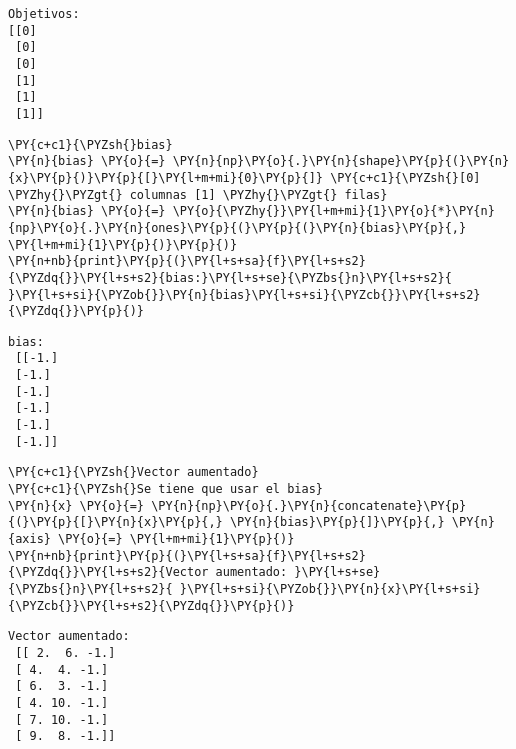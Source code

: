     \begin{Verbatim}[commandchars=\\\{\}]
Objetivos:
[[0]
 [0]
 [0]
 [1]
 [1]
 [1]]
    \end{Verbatim}

    \begin{tcolorbox}[breakable, size=fbox, boxrule=1pt, pad at break*=1mm,colback=cellbackground, colframe=cellborder]
\begin{Verbatim}[commandchars=\\\{\}]
\PY{c+c1}{\PYZsh{}bias}
\PY{n}{bias} \PY{o}{=} \PY{n}{np}\PY{o}{.}\PY{n}{shape}\PY{p}{(}\PY{n}{x}\PY{p}{)}\PY{p}{[}\PY{l+m+mi}{0}\PY{p}{]} \PY{c+c1}{\PYZsh{}[0] \PYZhy{}\PYZgt{} columnas [1] \PYZhy{}\PYZgt{} filas}
\PY{n}{bias} \PY{o}{=} \PY{o}{\PYZhy{}}\PY{l+m+mi}{1}\PY{o}{*}\PY{n}{np}\PY{o}{.}\PY{n}{ones}\PY{p}{(}\PY{p}{(}\PY{n}{bias}\PY{p}{,} \PY{l+m+mi}{1}\PY{p}{)}\PY{p}{)}
\PY{n+nb}{print}\PY{p}{(}\PY{l+s+sa}{f}\PY{l+s+s2}{\PYZdq{}}\PY{l+s+s2}{bias:}\PY{l+s+se}{\PYZbs{}n}\PY{l+s+s2}{ }\PY{l+s+si}{\PYZob{}}\PY{n}{bias}\PY{l+s+si}{\PYZcb{}}\PY{l+s+s2}{\PYZdq{}}\PY{p}{)}
\end{Verbatim}
\end{tcolorbox}

    \begin{Verbatim}[commandchars=\\\{\}]
bias:
 [[-1.]
 [-1.]
 [-1.]
 [-1.]
 [-1.]
 [-1.]]
    \end{Verbatim}

    \begin{tcolorbox}[breakable, size=fbox, boxrule=1pt, pad at break*=1mm,colback=cellbackground, colframe=cellborder]
\begin{Verbatim}[commandchars=\\\{\}]
\PY{c+c1}{\PYZsh{}Vector aumentado}
\PY{c+c1}{\PYZsh{}Se tiene que usar el bias}
\PY{n}{x} \PY{o}{=} \PY{n}{np}\PY{o}{.}\PY{n}{concatenate}\PY{p}{(}\PY{p}{[}\PY{n}{x}\PY{p}{,} \PY{n}{bias}\PY{p}{]}\PY{p}{,} \PY{n}{axis} \PY{o}{=} \PY{l+m+mi}{1}\PY{p}{)}
\PY{n+nb}{print}\PY{p}{(}\PY{l+s+sa}{f}\PY{l+s+s2}{\PYZdq{}}\PY{l+s+s2}{Vector aumentado: }\PY{l+s+se}{\PYZbs{}n}\PY{l+s+s2}{ }\PY{l+s+si}{\PYZob{}}\PY{n}{x}\PY{l+s+si}{\PYZcb{}}\PY{l+s+s2}{\PYZdq{}}\PY{p}{)}
\end{Verbatim}
\end{tcolorbox}

    \begin{Verbatim}[commandchars=\\\{\}]
Vector aumentado:
 [[ 2.  6. -1.]
 [ 4.  4. -1.]
 [ 6.  3. -1.]
 [ 4. 10. -1.]
 [ 7. 10. -1.]
 [ 9.  8. -1.]]
    \end{Verbatim}


